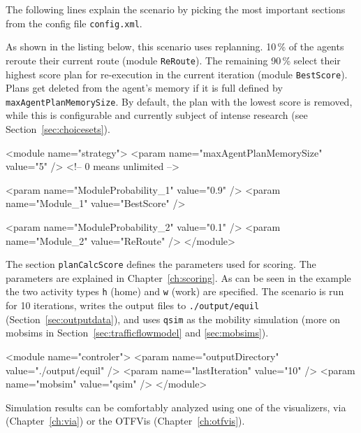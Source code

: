 The following lines explain the scenario by picking the most important sections from the config file \lstinline|config.xml|.

As shown in the listing below, this scenario uses replanning. 10\,\% of the agents reroute their current route (module \lstinline|ReRoute|). The remaining 90\,\% select their highest score plan for re-execution in the current iteration (module \lstinline|BestScore|). Plans get deleted from the agent's memory if it is full defined by \lstinline|maxAgentPlanMemorySize|. By default, the plan with the lowest score is removed, while this is configurable and currently subject of intense research (see Section~\ref{sec:choicesets}).
%
\begin{xml}
<module name="strategy">
	<param name="maxAgentPlanMemorySize" value="5" /> <!-- 0 means unlimited -->

	<param name="ModuleProbability_1" value="0.9" />
	<param name="Module_1" value="BestScore" />

	<param name="ModuleProbability_2" value="0.1" />
	<param name="Module_2" value="ReRoute" />
</module>
\end{xml}


The section \lstinline|planCalcScore| defines the parameters used for scoring. The parameters are explained in Chapter~\ref{ch:scoring}. As can be seen in the example the two activity types \lstinline|h| (home) and \lstinline|w| (work) are specified. The scenario is run for 10 iterations, writes the output files to \lstinline|./output/equil| (Section~\ref{sec:outputdata}), and uses \lstinline|qsim| as the mobility simulation (more on \gls{mobsim}s in Section~\ref{sec:trafficflowmodel} and \ref{sec:mobsims}).

\begin{xml}
<module name="controler">
	<param name="outputDirectory" value="./output/equil" />
	<param name="lastIteration" value="10" />
	<param name="mobsim" value="qsim" />	
</module>
\end{xml}


Simulation results can be comfortably analyzed using one of the visualizers, via (Chapter~\ref{ch:via}) or the OTFVis (Chapter~\ref{ch:otfvis}).

